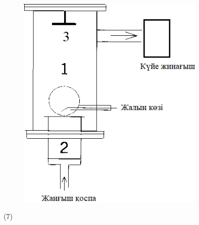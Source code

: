 \begin{figure}[H]
	\centering
	\includegraphics[width=0.8\textwidth]{assets/23}
	\caption*{}
\end{figure} (7)

